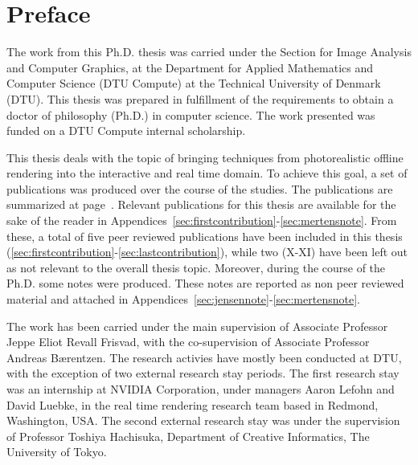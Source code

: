 \chapter{Preface}

The work from this Ph.D. thesis was carried under the Section for Image Analysis and Computer Graphics, at the Department for Applied Mathematics and Computer Science (DTU Compute) at the Technical University of Denmark (DTU). This thesis was prepared in fulfillment of the requirements to obtain a doctor of philosophy (Ph.D.) in computer science. The work presented was funded on a DTU Compute internal scholarship. 

This thesis deals with the topic of bringing techniques from photorealistic offline rendering into the interactive and real time domain. To achieve this goal, a set of publications was produced over the course of the studies. The publications are summarized at page~\pageref{sec:contributionlist}. Relevant  publications for this thesis are available for the sake of the reader in Appendices~\ref{sec:firstcontribution}-\ref{sec:mertensnote}. From these, a total of five peer reviewed publications have been included in this thesis (\ref{sec:firstcontribution}-\ref{sec:lastcontribution}), while two (X-XI) have been left out as not relevant to the overall thesis topic. Moreover, during the course of the Ph.D. some notes were produced. These notes are reported as non peer reviewed material and attached in Appendices~\ref{sec:jensennote}-\ref{sec:mertensnote}. 

The work has been carried under the main supervision of Associate Professor Jeppe Eliot Revall Frisvad, with the co-supervision of Associate Professor Andreas B\ae rentzen. The research activies have mostly been conducted at DTU, with the exception of two external research stay periods. The first research stay was an internship at NVIDIA Corporation, under managers Aaron Lefohn and David Luebke, in the real time rendering research team based in Redmond, Washington, USA. The second external research stay was under the supervision of Professor Toshiya Hachisuka, Department of Creative Informatics, The University of Tokyo.


